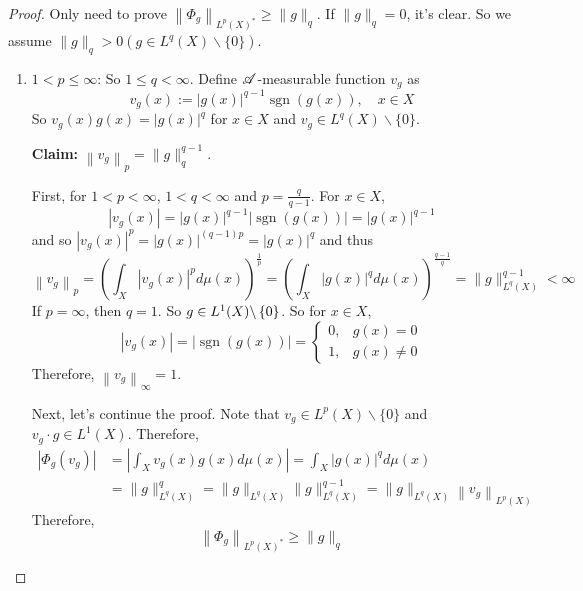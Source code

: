 \begin{proof}
	Only need to prove $\left\|\Phi_g\right\|_{L^p(X)^*} \geq\|g\|_{q}$. If $\|g\|_{q} = 0$, it's clear. So we assume $\|g\|_{q} > 0 (g \in L^q(X) \backslash\{0\})$.
	\begin{enumerate}[label=(\roman*)]
		\item $1 < p \leq \infty$: So $1 \leq q < \infty$. Define $\mathscr{A}$-measurable function $v_g$ as
		\begin{equation*}
			v_g(x):=|g(x)|^{q-1} \operatorname{sgn}(g(x)), \quad x \in X
		\end{equation*}
		So $v_g(x) g(x)=|g(x)|^q$ for $x \in X$ and $v_g \in L^q(X) \backslash\{0\}$.

		\noindent \textbf{Claim:} $\left\|v_g\right\|_{p}=\|g\|_{q}^{q-1}$.

		\noindent First, for $1 < p < \infty$, $1 < q < \infty$ and $p = \frac{q}{q - 1}$. For $x \in X$,
		\begin{equation*}
			\left|v_g(x)\right|=|g(x)|^{q-1}|\operatorname{sgn}(g(x))|=|g(x)|^{q-1}
		\end{equation*}
		and so $\left|v_g(x)\right|^p=|g(x)|^{(q-1) p}=|g(x)|^q$ and thus
		\begin{equation*}
			\left\|v_g\right\|_{p}=\left(\int_X\left|v_g(x)\right|^p d \mu(x)\right)^{\frac{1}{p}}=\left(\int_X|g(x)|^q d \mu(x)\right)^{\frac{q-1}{q}}=\|g\|_{L^q(X)}^{q-1}<\infty
		\end{equation*}
		If $p = \infty$, then $q = 1$. So $g \in L^1(X) \backslash \left\{0\right\}$. So for $x \in X$,
		\begin{equation*}
			\left|v_g(x)\right|=|\operatorname{sgn}(g(x))|= \begin{cases}0, & g(x)=0 \\ 1, & g(x) \neq 0\end{cases}
		\end{equation*}
		Therefore, $\left\|v_g\right\|_{\infty}=1$.

		\noindent Next, let's continue the proof. Note that $v_g \in L^p(X) \backslash\{0\}$ and $v_g \cdot g \in L^1(X)$. Therefore,
		\begin{equation*}
			\begin{aligned}
				\left|\Phi_g\left(v_g\right)\right| & =\left|\int_X v_g(x) g(x) d \mu(x)\right|=\int_X|g(x)|^q d \mu(x) \\
				& =\|g\|_{L^q(X)}^q=\|g\|_{L^q(X)}\|g\|_{L^q(X)}^{q-1}=\|g\|_{L^q(X)}\left\|v_g\right\|_{L^p(X)}
			\end{aligned}
		\end{equation*}
		Therefore, 
		\begin{equation*}
			\left\|\Phi_g\right\|_{L^p(X)^*} \geq\|g\|_{q}
		\end{equation*}


\end{enumerate}
\end{proof}
